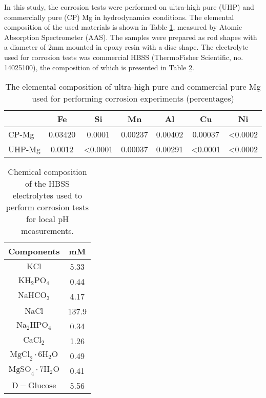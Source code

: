 In this study, the corrosion tests were performed on ultra-high pure ({UHP}) and commercially pure ({CP}) Mg in hydrodynamics conditions. The elemental composition of the used materials is shown in Table \ref{tab:kinetics_alloys_composition}, measured by Atomic Absorption Spectrometer (AAS). The samples were prepared as rod shapes with a diameter of $2\text{mm}$ mounted in epoxy resin with a disc shape. The electrolyte used for corrosion tests was commercial {HBSS} (ThermoFisher Scientific, no. 14025100), the composition of which is presented in Table \ref{tab:kinetics_electrolyte_composition}.


\begin{table}[t]
\caption[The elemental composition of highly-pure and commercial-pure Mg]{The elemental composition of ultra-high pure and commercial pure Mg used for performing corrosion experiments (percentages)}
\medskip
\centering
\begin{tabular}{lcccccc}
\hline & {Fe} & {Si} & {Mn} & {Al} & {Cu} & {Ni} \\
\hline { {CP}-Mg } & 0.03420 & 0.0001 & 0.00237 & 0.00402 & 0.00037 & <0.0002  \\
{ {UHP}-Mg } & 0.0012 & <0.0001 & 0.00037 & 0.00291 & <0.0001 & <0.0002
\end{tabular}
\label{tab:kinetics_alloys_composition}
\end{table}

\begin{table}[h]
\caption[Chemical composition of the HBSS electrolyte]{Chemical composition of the {HBSS} electrolytes used to perform corrosion tests for local pH measurements.}
\medskip
\centering
\begin{tabular}{cc}
\hline
{Components} & {mM} \\
\hline
$\mathrm{KCl}$ & 5.33 \\
$\mathrm{KH}_{2} \mathrm{PO}_{4}$ & 0.44 \\
$\mathrm{NaHCO}_{3}$ & 4.17 \\
$\mathrm{NaCl}$ & 137.9 \\
$\mathrm{Na}_{2} \mathrm{HPO}_{4}$ & 0.34 \\
$\mathrm{CaCl}_{2}$ & 1.26 \\
$\mathrm{MgCl}_{2} \cdot 6 \mathrm{H}_{2} \mathrm{O}$ & 0.49 \\
$\mathrm{MgSO}_{4} \cdot 7 \mathrm{H}_{2} \mathrm{O}$ & 0.41 \\
$\mathrm{D}-\mathrm{Glucose}$ & 5.56 \\
\hline

\end{tabular}
\label{tab:kinetics_electrolyte_composition}
\end{table}


